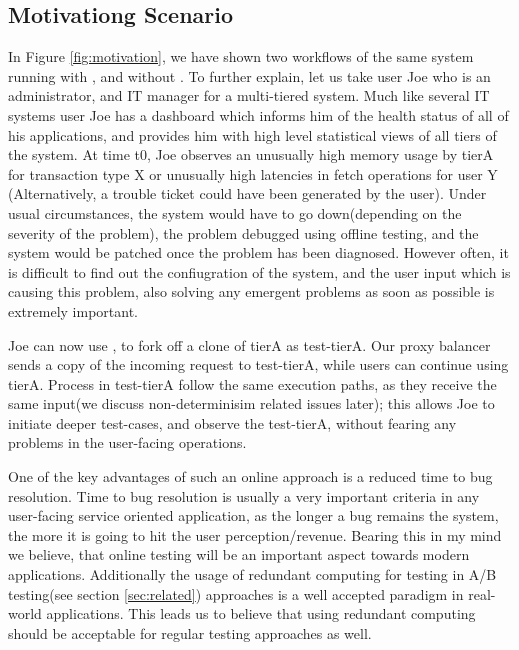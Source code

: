 


\subsection{Motivationg Scenario}

In Figure \ref{fig:motivation}, we have shown two workflows of the same system running with \parikshan, and without \parikshan.
To further explain, let us take  user Joe who is an administrator, and IT manager for a multi-tiered system. 
Much like several IT systems user Joe has a dashboard which informs him of the health status of all of his applications, and provides him with high level statistical views of all tiers of the system.
At time t0, Joe observes an unusually high memory usage by tierA for transaction type X or unusually high latencies in fetch operations for user Y (Alternatively, a trouble ticket could have been generated by the user).
Under usual circumstances, the system would have to go down(depending on the severity of the problem), the problem debugged using offline testing,  and the system would be patched once the problem has been diagnosed.
However often, it is difficult to find out the confiugration of the system, and the user input which is causing this problem, also solving any emergent problems as soon as possible is extremely important.

Joe can now use \parikshan, to fork off a clone of tierA as test-tierA. 
Our proxy balancer sends a copy of the incoming request to test-tierA, while users can continue using tierA. 
Process in test-tierA follow the same execution paths, as they receive the same input(we discuss non-determinisim related issues later); 
this allows Joe to initiate deeper test-cases, and observe the test-tierA, without fearing any problems in the user-facing operations.

One of the key advantages of such an online approach is a reduced time to bug resolution.
Time to bug resolution is usually a very important criteria in any user-facing service oriented application, as the longer a bug remains the system, the more it is going to hit the user perception/revenue.
Bearing this in my mind we believe, that online testing will be an important aspect towards modern applications.
Additionally the usage of redundant computing for testing in A/B testing(see section \ref{sec:related}) approaches is a well accepted paradigm in real-world applications.
This leads us to believe that using redundant computing should be acceptable for regular testing approaches as well.

